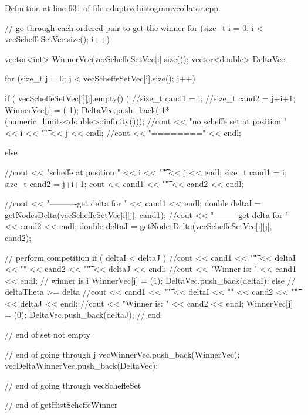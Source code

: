\-Definition at line 931 of file adaptivehistogramvcollator.\-cpp.


\begin{DoxyCode}
{ 
  // go through each ordered pair to get the winner
  for (size_t i = 0; i < vecScheffeSetVec.size(); i++) {
    
    vector<int> WinnerVec(vecScheffeSetVec[i].size());
    vector<double> DeltaVec;

    for (size_t j = 0; j < vecScheffeSetVec[i].size(); j++) {

      if ( vecScheffeSetVec[i][j].empty() ) {
        //size_t cand1 = i;
        //size_t cand2 = j+i+1;
        WinnerVec[j] = (-1);
        DeltaVec.push_back(-1*(numeric_limits<double>::infinity()));
        //cout << "no scheffe set at position " << i << "\t" << j << endl;
        //cout << "========" << endl;
      } 
    
      else {
        //cout << "scheffe at position " << i << "\t" << j << endl;
        size_t cand1 = i;
        size_t cand2 = j+i+1;
        cout << cand1 << "\t" << cand2 << endl;

        //cout << "----------get delta for " << cand1 << endl;
        double deltaI = getNodesDelta(vecScheffeSetVec[i][j], cand1);
        //cout << "---------get delta for " << cand2 << endl;
        double deltaJ = getNodesDelta(vecScheffeSetVec[i][j], cand2);

        // perform competition
        if ( deltaI < deltaJ ) {
          //cout << cand1 << "\t" << deltaI << "\n" << cand2 << "\t" << deltaJ
       << endl;
          //cout << "Winner is: " << cand1 << endl;
          // winner is i
          WinnerVec[j] = (1);
          DeltaVec.push_back(deltaI);
        }
        else { // deltaTheta >= delta 
          //cout << cand1 << "\t" << deltaI << "\n" << cand2 << "\t" << deltaJ
       << endl;
          //cout << "Winner is: " << cand2 << endl;
          WinnerVec[j] = (0);
          DeltaVec.push_back(deltaJ);
        }  // end
      } // end of set not empty
    } // end of going through j
    vecWinnerVec.push_back(WinnerVec);
    vecDeltaWinnerVec.push_back(DeltaVec);
  } // end of going through vecScheffeSet

} // end of getHistScheffeWinner
\end{DoxyCode}
